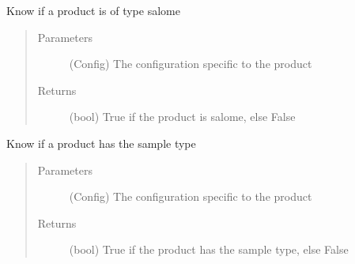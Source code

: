\documentclass[a4paper,10pt,english]{sphinxmanual}
\begin{document}
\begin{fulllineitems}
\label{\detokenize{apidoc_src/src:src.product.product_is_salome}}
Know if a product is of type salome
\begin{quote}\begin{description}
\item[{Parameters}] \leavevmode
{} \textendash{} (Config) 
The configuration specific to the product

\item[{Returns}] \leavevmode
(bool) 
True if the product is salome, else False

\end{description}\end{quote}

\end{fulllineitems}


\begin{fulllineitems}
\label{\detokenize{apidoc_src/src:src.product.product_is_sample}}
Know if a product has the sample type
\begin{quote}\begin{description}
\item[{Parameters}] \leavevmode
{} \textendash{} (Config)
The configuration specific to the product

\item[{Returns}] \leavevmode
(bool) 
True if the product has the sample type, else False

\end{description}\end{quote}

\end{fulllineitems}

\end{document}
